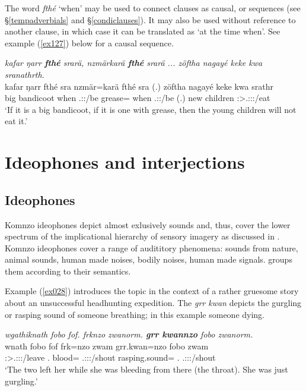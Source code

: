 The word \emph{fthé} `when' may be used to connect clauses as causal,  or  sequences (see \S\ref{tempadverbials} and \S\ref{condiclauses}). It may also be used without reference to another clause, in which case it can be translated as `at the time when'. See example (\ref{ex127}) below for a causal sequence.

\begin{exe}
	\ex \emph{kafar ŋarr \textbf{fthé} srarä, nzmärkarä \textbf{fthé} srarä ... zöftha nagayé keke kwa sranathrth.}\\
	\gll kafar ŋarr fthé sra nzmär=karä fthé sra (.) zöftha nagayé keke kwa srathr\\
	big bandicoot when \Tsg.\Masc:\Irr:\Ipfv/be grease=\Prop{} when \Tsg.\Masc:\Irr:\Ipfv/be (.) new children \Neg{} \Fut{} \Stsg:\Sbj>\Tsg.\Masc:\Obj:\Irr:\Ipfv/eat\\
	\trans `If it is a big bandicoot, if it is one with grease, then the young children will not eat it.' 
	\label{ex127}
\end{exe}

\section{Ideophones and interjections} \label{ideophones-and-interjections}

\subsection{Ideophones} \label{ideophonesec}

Komnzo ideophones depict almost exlusively sounds and, thus, cover the lower spectrum of the implicational hierarchy of sensory imagery as discussed in \citep[663]{Dingemanse:2012fc}. Komnzo ideophones cover a range of audititory phenomena: sounds from nature, animal sounds, human made noises, bodily noises, human made signals.  groups them according to their semantics.%

Example (\ref{ex028}) introduces the topic in the context of a rather gruesome story about an unsuccessful headhunting expedition. The  \emph{grr kwan} depicts the gurgling or rasping sound of someone breathing; in this example someone dying.

\begin{exe}
	\ex \emph{wgathiknath fobo fof. frknzo zwanorm. \textbf{grr kwannzo} fobo zwanorm.}\\
	\gll wnath fobo fof frk=nzo zwam grr.kwan=nzo fobo zwam\\
	\Stdu:\Sbj>\Tsg.\F:\Obj:\Pst:\Ipfv/leave \Dist{}.\All{} \Emph{} blood=\Only{} \Tsg.\F:\Sbj:\Pst:\Dur/shout rasping.sound=\Only{} \Dist{}.\All{} \Tsg.\F:\Sbj:\Pst:\Dur/shout\\
	\trans `The two left her while she was bleeding from there (the throat). She was just gurgling.' 
	\label{ex028}
\end{exe}

